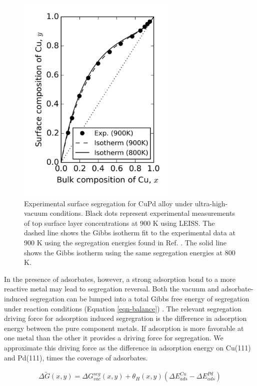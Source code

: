 \documentclass[12pt]{cmuthesis}
\begin{document}
\begin{figure}[h]
\centering
\includegraphics[width=3in]{./images/segvac.png}
\caption{Experimental surface segregation for CuPd alloy under ultra-high-vacuum conditions. Black dots represent experimental measurements of top surface layer concentrations at 900 K using LEISS. The dashed line shows the Gibbs isotherm fit to the experimental data at 900 K using the segregation energies found in Ref. . The solid line shows the Gibbs isotherm using the same segregation energies at 800 K. \label{fig:exp-seg}}
\end{figure}

In the presence of adsorbates, however, a strong adsorption bond to a more reactive metal may lead to segregation reversal. Both the vacuum and adsorbate-induced segregation can be lumped into a total Gibbs free energy of segregation under reaction conditions (Equation \eqref{eqn-balance}) \cite{kitchin-2008-alloy,miller-2008-effec-adsor}. The relevant segregation driving force for adsorption induced segregration is the difference in adsorption energy between the pure component metals. If adsorption is more favorable at one metal than the other it provides a driving force for segregation. We approximate this driving force as the difference in adsorption energy on Cu(111) and Pd(111), times the coverage of adsorbates.

\begin{eqnarray}
\Delta \widetilde{G} (x,y) = \Delta G^{seg}_{vac} (x,y) + \theta_{H} (x,y) \left(\Delta E^{Cu}_{ads} - \Delta E^{Pd}_{ads}\right)
\label{eqn-balance}
\end{eqnarray}
\end{document}
